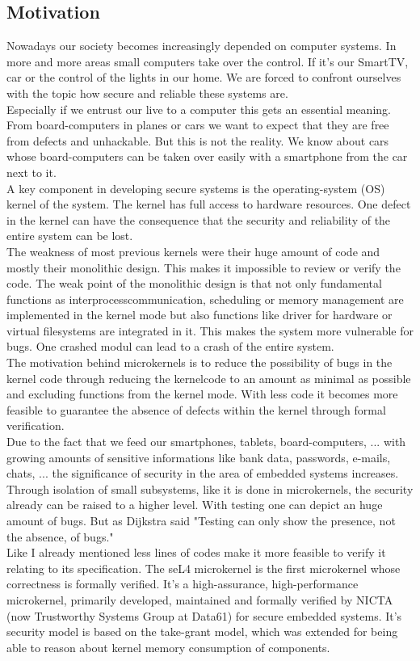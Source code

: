 \documentclass[pdftex,11pt,a4paper,twoside]{article}
\begin{document}
	\subsection{Motivation}
Nowadays our society becomes increasingly depended on computer systems. In more and more areas small computers take over the control. If it's our SmartTV, car or the control of the lights in our home. We are forced to confront ourselves with the topic how secure and reliable these systems are. \\
Especially if we entrust our live to a computer this gets an essential meaning. From board-computers in planes or cars we want to expect that they are free from defects and unhackable. But this is not the reality. We know about cars whose board-computers can be taken over easily with a smartphone from the car next to it. \\
A key component in developing secure systems is the operating-system (OS) kernel of the system. The kernel has full access to hardware resources. One defect in the kernel can have the consequence that the security and reliability of the entire system can be lost. \\
The weakness of most previous kernels were their huge amount of code and mostly their monolithic design. This makes it impossible to review or verify the code. The weak point of the monolithic design is that not only fundamental functions as interprocesscommunication, scheduling or memory management are implemented in the kernel mode but also functions like driver for hardware or virtual filesystems are integrated in it. This makes the system more vulnerable for bugs. One crashed modul can lead to a crash of the entire system. \\
The motivation behind microkernels is to reduce the  possibility of bugs in the kernel code through reducing the kernelcode to an amount as minimal as possible and excluding functions from the kernel mode. With less code it becomes more feasible to guarantee the absence of defects within the kernel through formal verification.\\
Due to the fact that we feed our smartphones, tablets, board-computers, ... with growing amounts of sensitive informations like bank data, passwords, e-mails, chats, ... the significance of security in the area of embedded systems increases. \\
Through isolation of small subsystems, like it is done in microkernels, the security already can be raised to a higher level. With testing one can depict an huge amount of bugs. But as Dijkstra said "Testing can only show the presence, not the absence, of bugs." \cite{EngTec} \\
Like I already mentioned less lines of codes make it more feasible to verify it relating to its specification. 
The seL4 microkernel is the first microkernel whose correctness is formally verified. It's a high-assurance, high-performance microkernel, primarily developed, maintained and formally verified by NICTA (now Trustworthy Systems Group at Data61) for secure embedded systems. It's security model is based on the take-grant model, which was extended for being able to reason about kernel memory consumption of components. 
\end{document}
